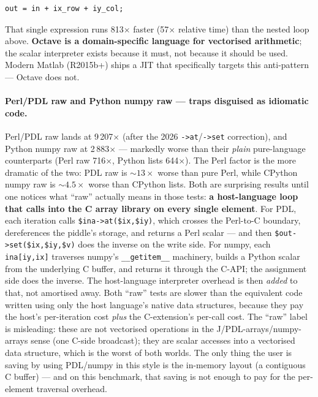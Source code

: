 \documentclass[11pt,a4paper]{article}
\begin{document}
\begin{lstlisting}
out = in + ix_row + iy_col;
\end{lstlisting}

\noindent
That single expression runs 813$\times$ faster (57$\times$ relative
time) than the nested loop above. \textbf{Octave is a domain-specific
language for vectorised arithmetic}; the scalar interpreter exists
because it must, not because it should be used. Modern Matlab
(R2015b+) ships a JIT that specifically targets this anti-pattern ---
Octave does not.

\paragraph{Perl/PDL raw and Python numpy raw --- traps disguised as
idiomatic code.}
Perl/PDL raw lands at 9\,207$\times$ (after the 2026
\verb|->at|/\verb|->set| correction), and Python numpy raw at
2\,883$\times$ --- markedly worse than their \emph{plain}
pure-language counterparts (Perl raw 716$\times$, Python lists
644$\times$). The Perl factor is the more dramatic of the two: PDL
raw is $\sim\!13\!\times$ worse than pure Perl, while CPython numpy
raw is $\sim\!4.5\!\times$ worse than CPython lists. Both are surprising results until one notices
what ``raw'' actually means in those tests: \textbf{a host-language
loop that calls into the C array library on every single element}.
For PDL, each iteration calls \verb|$ina->at($ix,$iy)|, which
crosses the Perl-to-C boundary, dereferences the piddle's storage,
and returns a Perl scalar --- and then \verb|$out->set($ix,$iy,$v)|
does the inverse on the write side. For numpy, each
\verb|ina[iy,ix]| traverses numpy's \verb|__getitem__| machinery,
builds a Python scalar from the underlying C buffer, and returns it
through the C-API; the assignment side does the inverse. The
host-language interpreter overhead is then \emph{added} to that,
not amortised away. Both ``raw'' tests are slower than the
equivalent code written using only the host language's native data
structures, because they pay the host's per-iteration cost
\emph{plus} the C-extension's per-call cost.
The ``raw'' label is misleading: these are not vectorised operations
in the J/PDL-arrays/numpy-arrays sense (one C-side broadcast); they
are scalar accesses into a vectorised data structure, which is the
worst of both worlds. The only thing the user is saving by using
PDL/numpy in this style is the in-memory layout (a contiguous C
buffer) --- and on this benchmark, that saving is not enough to pay
for the per-element traversal overhead.
\end{document}
